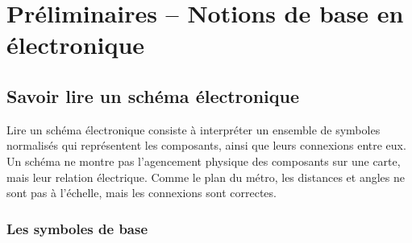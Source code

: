 \chapter{Pr\'eliminaires -- Notions de base en \'electronique}

\section{Savoir lire un sch\'ema \'electronique}\label{sec:schematic}

Lire un sch\'ema \'electronique consiste à interpr\'eter un ensemble de symboles normalis\'es
qui repr\'esentent les composants, ainsi que leurs connexions entre eux.
Un sch\'ema ne montre pas l’agencement physique des composants sur une carte, mais leur
relation \'electrique. Comme le plan du m\'etro, les distances et angles ne sont pas
à l’\'echelle, mais les connexions sont correctes.

\subsection{Les symboles de base}

